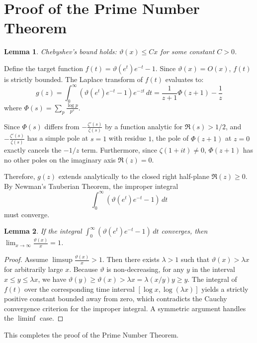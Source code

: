 \documentclass[12pt]{article}
\newtheorem{lemma}{Lemma}
\begin{document}
\section{Proof of the Prime Number Theorem}

\begin{lemma}
Chebyshev's bound holds: $\vartheta(x) \le Cx$ for some constant $C > 0$.
\end{lemma}

Define the target function $f(t) = \vartheta(e^t)e^{-t} - 1$. Since $\vartheta(x) = O(x)$, $f(t)$ is strictly bounded. 
The Laplace transform of $f(t)$ evaluates to:
\[ g(z) = \int_0^\infty (\vartheta(e^t)e^{-t} - 1) e^{-zt} \, dt = \frac{1}{z+1}\Phi(z+1) - \frac{1}{z} \]
where $\Phi(s) = \sum_p \frac{\log p}{p^s}$. 

Since $\Phi(s)$ differs from $-\frac{\zeta'(s)}{\zeta(s)}$ by a function analytic for $\Re(s) > 1/2$, and $-\frac{\zeta'(s)}{\zeta(s)}$ has a simple pole at $s=1$ with residue $1$, the pole of $\Phi(z+1)$ at $z=0$ exactly cancels the $-1/z$ term.
Furthermore, since $\zeta(1+it) \neq 0$, $\Phi(z+1)$ has no other poles on the imaginary axis $\Re(z) = 0$. 

Therefore, $g(z)$ extends analytically to the closed right half-plane $\Re(z) \ge 0$. By Newman's Tauberian Theorem, the improper integral
\[ \int_0^\infty (\vartheta(e^t)e^{-t} - 1) \, dt \]
must converge.

\begin{lemma}
If the integral $\int_0^\infty (\vartheta(e^t)e^{-t} - 1) \, dt$ converges, then $\lim_{x \to \infty} \frac{\vartheta(x)}{x} = 1$.
\end{lemma}
\begin{proof}
Assume $\limsup \frac{\vartheta(x)}{x} > 1$. Then there exists $\lambda > 1$ such that $\vartheta(x) > \lambda x$ for arbitrarily large $x$. Because $\vartheta$ is non-decreasing, for any $y$ in the interval $x \le y \le \lambda x$, we have $\vartheta(y) \ge \vartheta(x) > \lambda x = \lambda (x/y) y \ge y$. 
The integral of $f(t)$ over the corresponding time interval $[\log x, \log(\lambda x)]$ yields a strictly positive constant bounded away from zero, which contradicts the Cauchy convergence criterion for the improper integral. A symmetric argument handles the $\liminf$ case. 
\end{proof}

This completes the proof of the Prime Number Theorem.
\end{document}
